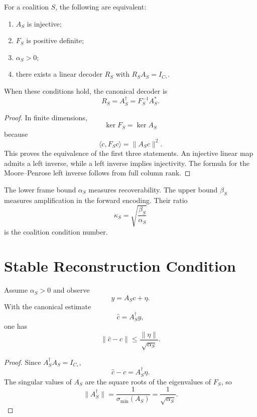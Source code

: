 \begin{SRWTproposition}\label{SRWT:prop:coalition-frame-criterion}
For a coalition \(S\), the following are equivalent:
\begin{enumerate}
\item \(A_S\) is injective;
\item \(F_S\) is positive definite;
\item \(\alpha_S>0\);
\item there exists a linear decoder \(R_S\) with \(R_SA_S=I_{C_*}\).
\end{enumerate}
When these conditions hold, the canonical decoder is
\[
\boxed{
R_S=A_S^\dagger=F_S^{-1}A_S^*.
}
\]
\end{SRWTproposition}

\begin{proof}
In finite dimensions,
\[
\ker F_S=\ker A_S
\]
because
\[
\langle c,F_Sc\rangle=\|A_Sc\|^2.
\]
This proves the equivalence of the first three statements. An injective linear
map admits a left inverse, while a left inverse implies injectivity. The
formula for the Moore--Penrose left inverse follows from full column rank.
\end{proof}

The lower frame bound \(\alpha_S\) measures recoverability. The upper bound
\(\beta_S\) measures amplification in the forward encoding. Their ratio
\[
\kappa_S=\sqrt{\frac{\beta_S}{\alpha_S}}
\]
is the coalition condition number.

\section{Stable Reconstruction Condition}


\begin{SRWTtheorem}\label{SRWT:thm:stable-reconstruction}
Assume \(\alpha_S>0\) and observe
\[
y=A_Sc+\eta.
\]
With the canonical estimate
\[
\widehat c=A_S^\dagger y,
\]
one has
\[
\boxed{
\|\widehat c-c\|
\leq
\frac{\|\eta\|}{\sqrt{\alpha_S}}.
}
\]
\end{SRWTtheorem}

\begin{proof}
Since \(A_S^\dagger A_S=I_{C_*}\),
\[
\widehat c-c=A_S^\dagger\eta.
\]
The singular values of \(A_S\) are the square roots of the eigenvalues of
\(F_S\), so
\[
\|A_S^\dagger\|
=
\frac{1}{\sigma_{\min}(A_S)}
=
\frac{1}{\sqrt{\alpha_S}}.
\]
\end{proof}

